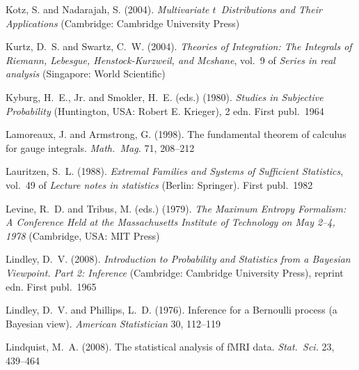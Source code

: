 \documentclass[%
]{frontiersSCNS-nologo} %
\renewcommand*{\|}{\mathpunct{|}}%
\begin{document}
\begin{thebibliography}{156}
Kotz, S. and Nadarajah, S. (2004).
\newblock \emph{Multivariate {$t$}~Distributions and Their Applications}
  (Cambridge: Cambridge University Press)

Kurtz, D.~S. and Swartz, C.~W. (2004).
\newblock \emph{Theories of Integration: The Integrals of Riemann, Lebesgue,
  Henstock-Kurzweil, and Mcshane}, vol.~9 of \emph{Series in real analysis}
  (Singapore: World Scientific)

Kyburg, H.~E., Jr. and Smokler, H.~E. (eds.) (1980).
\newblock \emph{Studies in Subjective Probability} (Huntington, USA: Robert E.
  Krieger), 2 edn.
\newblock First publ.\ 1964

Lamoreaux, J. and Armstrong, G. (1998).
\newblock The fundamental theorem of calculus for gauge integrals.
\newblock \emph{Math.\ Mag.} 71, 208--212

Lauritzen, S.~L. (1988).
\newblock \emph{Extremal Families and Systems of Sufficient Statistics},
  vol.~49 of \emph{Lecture notes in statistics} (Berlin: Springer).
\newblock First publ.\ 1982

Levine, R.~D. and Tribus, M. (eds.) (1979).
\newblock \emph{The Maximum Entropy Formalism: A Conference Held at the
  Massachusetts Institute of Technology on May 2--4, 1978} (Cambridge, USA: MIT
  Press)

Lindley, D.~V. (2008).
\newblock \emph{Introduction to Probability and Statistics from a Bayesian
  Viewpoint. Part 2: Inference} (Cambridge: Cambridge University Press),
  reprint edn.
\newblock First publ.\ 1965

Lindley, D.~V. and Phillips, L.~D. (1976).
\newblock Inference for a {Bernoulli} process (a {Bayesian} view).
\newblock \emph{American Statistician} 30, 112--119

Lindquist, M.~A. (2008).
\newblock The statistical analysis of {fMRI} data.
\newblock \emph{Stat.\ Sci.} 23, 439--464


\end{thebibliography}
\end{document}
